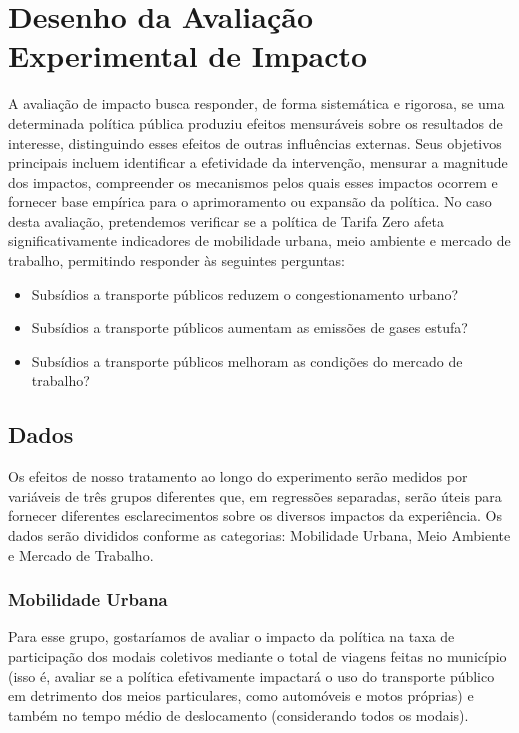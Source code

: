 
\section{Desenho da Avaliação Experimental de Impacto}

A avaliação de impacto busca responder, de forma sistemática e rigorosa, se uma determinada política pública produziu efeitos mensuráveis sobre os resultados de interesse, distinguindo esses efeitos de outras influências externas. Seus objetivos principais incluem identificar a efetividade da intervenção, mensurar a magnitude dos impactos, compreender os mecanismos pelos quais esses impactos ocorrem e fornecer base empírica para o aprimoramento ou expansão da política. No caso desta avaliação, pretendemos verificar se a política de Tarifa Zero afeta significativamente indicadores de mobilidade urbana, meio ambiente e mercado de trabalho, permitindo responder às seguintes perguntas:
\begin{itemize}
    \item Subsídios a transporte públicos reduzem o congestionamento urbano?
    \item Subsídios a transporte públicos aumentam as emissões de gases estufa?
    \item Subsídios a transporte públicos melhoram as condições do mercado de trabalho?
\end{itemize}

\subsection{Dados}

Os efeitos de nosso tratamento ao longo do experimento serão medidos por variáveis de três grupos diferentes que, em regressões separadas, serão úteis para fornecer diferentes esclarecimentos sobre os diversos impactos da experiência. Os dados serão divididos conforme as categorias: Mobilidade Urbana, Meio Ambiente e Mercado de Trabalho.

\subsubsection{Mobilidade Urbana}
Para esse grupo, gostaríamos de avaliar o impacto da política na taxa de participação dos modais coletivos mediante o total de viagens feitas no município (isso é, avaliar se a política efetivamente impactará o uso do transporte público em detrimento dos meios particulares, como automóveis e motos próprias) e também no tempo médio de deslocamento (considerando todos os modais).

